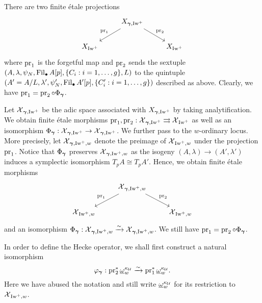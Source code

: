 There are two finite \'etale projections 
$$
\begin{tikzcd}
& X_{\bfgamma, \Iw^+}\arrow[ld, "\pr_1"']\arrow[rd, "\pr_2"] \\
X_{\Iw^+} & & X_{\Iw^+}
\end{tikzcd}$$ 
where $\pr_1$ is the forgetful map and $\pr_2$ sends the sextuple $(A, \lambda, \psi_N, \Fil_{\bullet}A[p], \{C_i: i=1, \ldots, g\}, L)$ to the quintuple $(A'=A/L, \lambda', \psi'_N, \Fil_{\bullet}A'[p], \{C'_i: i=1, \ldots, g\})$ described as above. Clearly, we have $\pr_1=\pr_2\circ \Phi_{\bfgamma}$.

Let $\calX_{\bfgamma, \Iw^+}$ be the adic space associated with $X_{\bfgamma, \Iw^+}$ by taking analytification. We obtain finite \'etale morphisms $\pr_1, \pr_2:\calX_{\bfgamma, \Iw^+}\rightrightarrows \calX_{\Iw^+}$ as well as an isomorphism $\Phi_{\bfgamma}:\calX_{\bfgamma, \Iw^+}\rightarrow \calX_{\bfgamma, \Iw^+}$. We further pass to the $w$-ordinary locus. More precisely, let $\calX_{\bfgamma, \Iw^+, w}$ denote the preimage of $\calX_{\Iw^+, w}$ under the projection $\pr_1$. Notice that $\Phi_{\bfgamma}$ preserves $\calX_{\bfgamma, \Iw^+, w}$ as the isogeny $(A, \lambda)\rightarrow (A', \lambda')$ induces a symplectic isomorphism $T_pA\cong T_pA'$. Hence, we obtain finite \'etale morphisms 
\begin{equation}\label{eq: correspondence-strict-Iw-level}
\begin{tikzcd}
& \calX_{\bfgamma, \Iw^+,w}\arrow[ld, "\pr_1"']\arrow[rd, "\pr_2"] \\
\calX_{\Iw^+,w} & & \calX_{\Iw^+,w}
\end{tikzcd}
\end{equation}
and an isomorphism $\Phi_{\bfgamma}:\calX_{\bfgamma,\Iw^+,w}\xrightarrow[]{\sim} \calX_{\bfgamma,\Iw^+,w}$. We still have $\pr_1=\pr_2\circ \Phi_{\bfgamma}$. 

In order to define the Hecke operator, we shall first construct a natural isomorphism
$$\varphi_{\bfgamma}: \pr_2^*\underline{\omega}^{\kappa_{\calU}}_w\xrightarrow[]{\sim}\pr_1^*\underline{\omega}^{\kappa_{\calU}}_w.$$
Here we have abused the notation and still write $\underline{\omega}^{\kappa_{\calU}}_w$ for its restriction to $\calX_{\Iw^+, w}$.

